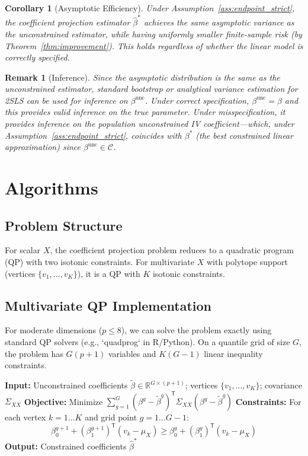 \documentclass[12pt]{article}
\newcommand{\T}{\mathsf{T}}
\newcommand{\R}{\mathbb{R}}
\newtheorem{corollary}{Corollary}
\newtheorem{remark}{Remark}
\begin{document}
\begin{corollary}[Asymptotic Efficiency]
Under Assumption~\ref{ass:endpoint_strict}, the coefficient projection estimator $\hat{\beta}^*$ achieves the same asymptotic variance as the unconstrained estimator, while having uniformly smaller finite-sample risk (by Theorem~\ref{thm:improvement}). This holds regardless of whether the linear model is correctly specified.
\end{corollary}

\begin{remark}[Inference]
Since the asymptotic distribution is the same as the unconstrained estimator, standard bootstrap or analytical variance estimation for 2SLS can be used for inference on $\beta^{\text{unc}}$. Under correct specification, $\beta^{\text{unc}} = \beta$ and this provides valid inference on the true parameter. Under misspecification, it provides inference on the population unconstrained IV coefficient---which, under Assumption~\ref{ass:endpoint_strict}, coincides with $\beta^*$ (the best constrained linear approximation) since $\beta^{\text{unc}} \in \mathcal{C}$.
\end{remark}

\section{Algorithms}

\subsection{Problem Structure}

For scalar $X$, the coefficient projection problem reduces to a quadratic program (QP) with two isotonic constraints. For multivariate $X$ with polytope support (vertices $\{v_1, \dots, v_K\}$), it is a QP with $K$ isotonic constraints.

\subsection{Multivariate QP Implementation}

For moderate dimensions ($p \leq 8$), we can solve the problem exactly using standard QP solvers (e.g., `quadprog` in R/Python). On a quantile grid of size $G$, the problem has $G(p+1)$ variables and $K(G-1)$ linear inequality constraints.

\begin{algorithm}
\caption{Multivariate Coefficient Projection (QP)}
\begin{algorithmic}[1]
\State \textbf{Input:} Unconstrained coefficients $\tilde{\beta} \in \R^{G \times (p+1)}$; vertices $\{v_1, \dots, v_K\}$; covariance $\Sigma_{XX}$
\State \textbf{Objective:} Minimize $\sum_{g=1}^G (\beta^g - \tilde{\beta}^g)^\T \Sigma_{XX} (\beta^g - \tilde{\beta}^g)$
\State \textbf{Constraints:} For each vertex $k=1 \dots K$ and grid point $g=1 \dots G-1$:
\[ \beta_0^{g+1} + (\beta_1^{g+1})^\T (v_k - \mu_X) \geq \beta_0^g + (\beta_1^g)^\T (v_k - \mu_X) \]
\State \textbf{Output:} Constrained coefficients $\hat{\beta}^*$
\end{algorithmic}
\end{algorithm}
\end{document}
